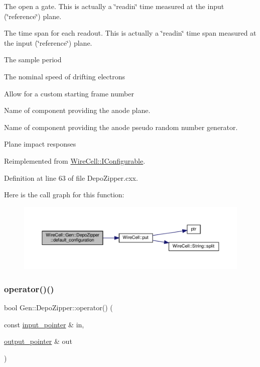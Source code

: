The open a gate. This is actually a \char`\"{}readin\char`\"{} time measured at the input (\char`\"{}reference\char`\"{}) plane.

The time span for each readout. This is actually a \char`\"{}readin\char`\"{} time span measured at the input (\char`\"{}reference\char`\"{}) plane.

The sample period

The nominal speed of drifting electrons

Allow for a custom starting frame number

Name of component providing the anode plane.

Name of component providing the anode pseudo random number generator.

Plane impact responses 

Reimplemented from \hyperlink{class_wire_cell_1_1_i_configurable_a54841b2da3d1ea02189478bff96f7998}{Wire\+Cell\+::\+I\+Configurable}.



Definition at line 63 of file Depo\+Zipper.\+cxx.

Here is the call graph for this function\+:
\nopagebreak
\begin{figure}[H]
\begin{center}
\leavevmode
\includegraphics[width=350pt]{class_wire_cell_1_1_gen_1_1_depo_zipper_aaecdc02da3fb1362266b4606cfe9e03f_cgraph}
\end{center}
\end{figure}
\mbox{\label{class_wire_cell_1_1_gen_1_1_depo_zipper_af883a6a654a4a374d17f4db84d268510}} 
\subsubsection{\texorpdfstring{operator()()}{operator()()}}
{\footnotesize\ttfamily bool Gen\+::\+Depo\+Zipper\+::operator() (\begin{DoxyParamCaption}\item[{const \hyperlink{class_wire_cell_1_1_i_function_node_a55c0946156df9b712b8ad1a0b59b2db6}{input\+\_\+pointer} \&}]{in,  }\item[{\hyperlink{class_wire_cell_1_1_i_function_node_afc02f1ec60d31aacddf64963f9ca650b}{output\+\_\+pointer} \&}]{out }\end{DoxyParamCaption})\hspace{0.3cm}{\ttfamily [virtual]}}



